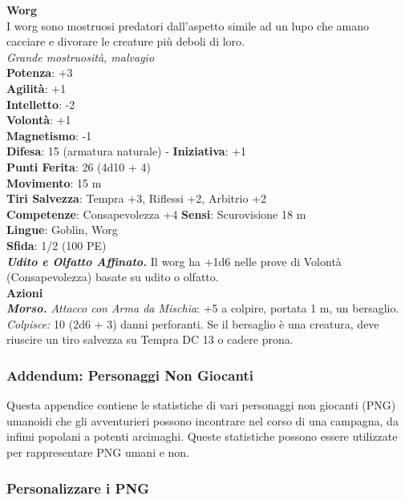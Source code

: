 \begin{multicols}{2}
\medskip\textbf{Worg}\\
I worg sono mostruosi predatori dall'aspetto simile ad un lupo che amano cacciare e divorare le creature più deboli di loro.\\
\emph{Grande mostruosità, malvagio}\\
\textbf{Potenza}: +3\\
\textbf{Agilità}: +1\\
\textbf{Intelletto}: -2\\
\textbf{Volontà}: +1\\
\textbf{Magnetismo}: -1\\
\textbf{Difesa}: 15 (armatura naturale) - \textbf{Iniziativa}: +1\\
\textbf{Punti Ferita}: 26 (4d10 + 4)\\
\textbf{Movimento}: 15 m\\
\textbf{Tiri Salvezza}: Tempra +3, Riflessi +2, Arbitrio +2 \\
\textbf{Competenze}: Consapevolezza +4
\textbf{Sensi}: Scurovisione 18 m\\
\textbf{Lingue}: Goblin, Worg\\
\textbf{Sfida}: 1/2 (100 PE)\smallskip\\
\emph{\textbf{Udito e Olfatto Affinato.}} Il worg ha +1d6 nelle prove di Volontà (Consapevolezza) basate su udito o olfatto.\\
\smallskip\textbf{Azioni}\\
\emph{\textbf{Morso.} Attacco con Arma da Mischia}: +5 a colpire, portata 1 m, un bersaglio.\\
\emph{Colpisce:} 10 (2d6 + 3) danni perforanti. Se il bersaglio è una creatura, deve riuscire un tiro salvezza su Tempra DC 13 o cadere prona. 

\pagebreak

\subsubsection{Addendum: Personaggi Non Giocanti}

Questa appendice contiene le statistiche di vari personaggi non giocanti (PNG) umanoidi che gli avventurieri possono incontrare nel corso di una campagna, da infimi popolani a potenti arcimaghi. Queste statistiche possono essere utilizzate per rappresentare PNG umani e non.\\

\subsubsection{Personalizzare i PNG}


\end{multicols}
